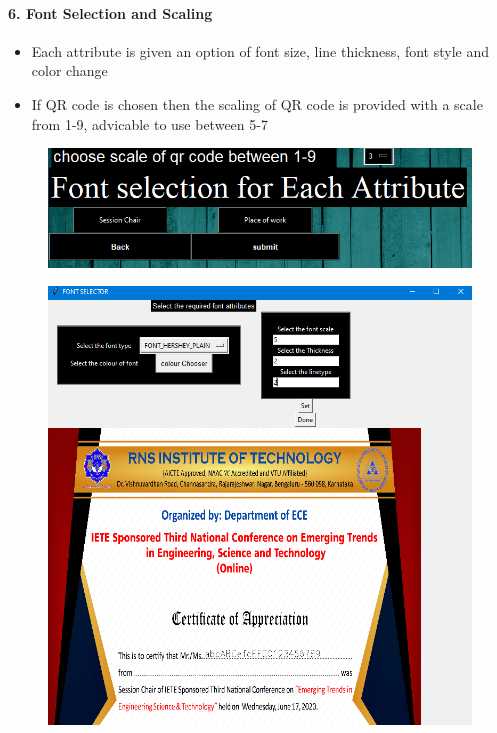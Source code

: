 \newpage
\paragraph{6. Font Selection and Scaling}

\begin{itemize}
	\item Each attribute is given an option of font size, line thickness, font style and color change
	\item If QR code is chosen then the scaling of QR code is provided with a scale from 1-9, advicable to use between 5-7 
\end{itemize}

\begin{figure}[H]
	\centering
	\includegraphics[width=0.85\linewidth]{"images/generation_qr_nqr/Screenshot (57)"}
	\label{fig:screenshot-57}
\end{figure}

\begin{figure}[H]
	\centering
	\includegraphics[width=0.85\linewidth]{"images/generation_qr_nqr/Screenshot (42)"}
	\label{fig:screenshot-42}
\end{figure}

